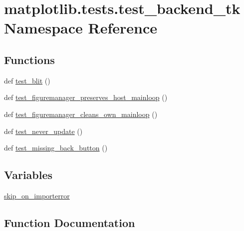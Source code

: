 \hypertarget{namespacematplotlib_1_1tests_1_1test__backend__tk}{}\section{matplotlib.\+tests.\+test\+\_\+backend\+\_\+tk Namespace Reference}
\label{namespacematplotlib_1_1tests_1_1test__backend__tk}
\subsection*{Functions}
\begin{DoxyCompactItemize}
\item 
def \hyperlink{namespacematplotlib_1_1tests_1_1test__backend__tk_a2d8bbedc438faf700e881529ae09f219}{test\+\_\+blit} ()
\item 
def \hyperlink{namespacematplotlib_1_1tests_1_1test__backend__tk_ab9199567a312c8da6d1578a5669b2388}{test\+\_\+figuremanager\+\_\+preserves\+\_\+host\+\_\+mainloop} ()
\item 
def \hyperlink{namespacematplotlib_1_1tests_1_1test__backend__tk_ac5cc2d9f7449cc2f9db38dcd479e990e}{test\+\_\+figuremanager\+\_\+cleans\+\_\+own\+\_\+mainloop} ()
\item 
def \hyperlink{namespacematplotlib_1_1tests_1_1test__backend__tk_af672cfa4287ac5f46b44ef87f80d3880}{test\+\_\+never\+\_\+update} ()
\item 
def \hyperlink{namespacematplotlib_1_1tests_1_1test__backend__tk_ae2129f8ba17973dfd6d828da2e9e1e85}{test\+\_\+missing\+\_\+back\+\_\+button} ()
\end{DoxyCompactItemize}
\subsection*{Variables}
\begin{DoxyCompactItemize}
\item 
\hyperlink{namespacematplotlib_1_1tests_1_1test__backend__tk_a9700483f635f2b949e2141c6aa5a246f}{skip\+\_\+on\+\_\+importerror}
\end{DoxyCompactItemize}


\subsection{Function Documentation}
\mbox{\label{namespacematplotlib_1_1tests_1_1test__backend__tk_a2d8bbedc438faf700e881529ae09f219}} 
